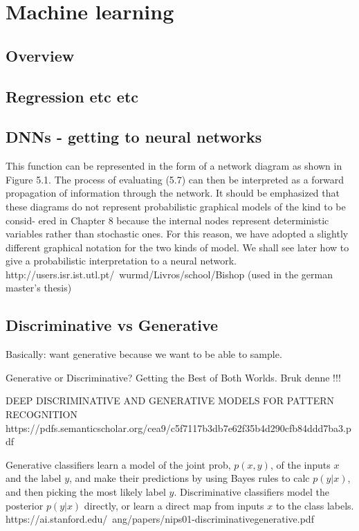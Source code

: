 \documentclass[twoside,english]{uiofysmaster}
\begin{document}
\chapter{Machine learning}
\section{Overview}
\section{Regression etc etc}
\section{DNNs - getting to neural networks}
This function can be represented in the form of a network diagram as shown in Figure 5.1. The process of evaluating (5.7) can then be interpreted as a forward propagation of information through the network. It should be emphasized that these diagrams do not represent probabilistic graphical models of the kind to be consid- ered in Chapter 8 because the internal nodes represent deterministic variables rather than stochastic ones. For this reason, we have adopted a slightly different graphical notation for the two kinds of model. We shall see later how to give a probabilistic interpretation to a neural network.
http://users.isr.ist.utl.pt/~wurmd/Livros/school/Bishop%
\cite{Bishop2006} (used in the german master's thesis)


\section{Discriminative vs Generative}
Basically: want generative because we want to be able to sample.

Generative or Discriminative? Getting the Best of Both Worlds. Bruk denne !!!

DEEP DISCRIMINATIVE AND GENERATIVE MODELS FOR PATTERN RECOGNITION
https://pdfs.semanticscholar.org/cea9/c5f7117b3db7e62f35b4d290cfb84ddd7ba3.pdf

Generative classifiers learn a model of the joint prob, $p(x,y)$, of the inputs $x$ and the label $y$, and make their predictions by using Bayes rules to calc $p(y|x)$, and then picking the most likely label $y$. Discriminative classifiers model the posterior $p(y|x)$ directly, or learn a direct map from inputs $x$ to the class labels. 
https://ai.stanford.edu/~ang/papers/nips01-discriminativegenerative.pdf
\end{document}
